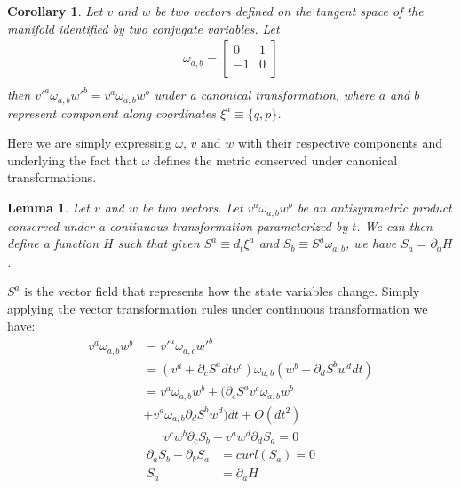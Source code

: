 \documentclass[aps,pra,10pt,twocolumn,floatfix,nofootinbib]{revtex4-1}
\newtheorem{cor}[thm]{Corollary}
\newtheorem{lem}[thm]{Lemma}
\theoremstyle{definition}
\begin{document}
\begin{cor}\label{sdofInvariant}
Let $v$ and $w$ be two vectors defined on the tangent space of the manifold identified by two conjugate variables. Let
\begin{align*}
\omega_{a, b} = \left[
  \begin{array}{cc}
    0 & 1 \\
    -1 & 0 \\
  \end{array}
\right] \\
\end{align*}
then $v'^{a} \omega_{a, b} w'^{b}=v^{a} \omega_{a, b} w^{b}$ under a canonical transformation, where $a$ and $b$ represent component along coordinates $\xi^{a} \equiv \{q,p\}$.
\end{cor}

Here we are simply expressing $\omega$, $v$ and $w$ with their respective components and underlying the fact that $\omega$ defines the metric conserved under canonical transformations.

\begin{lem}\label{genAntisim}
Let $v$ and $w$ be two vectors. Let $v^{a} \omega_{a, b} w^{b}$ be an antisymmetric product conserved under a continuous transformation parameterized by $t$. We can then define a function $H$ such that given $S^{a} \equiv d_{t}\xi^{a}$ and $S_{b} \equiv S^{a} \omega_{a, b}$, we have $S_{a} = \partial_{a}H$.
\end{lem}

$S^{a}$ is the vector field that represents how the state variables change. Simply applying the vector transformation rules under continuous transformation we have:
\begin{align*}
v^{a} \omega_{a, b} w^{b} &= v'^{a} \omega_{a, c} w'^{b}  \\
&= (v^{a} + \partial_{c} S^{a} dt v^{c}) \omega_{a, b} ( w^{b} + \partial_{d} S^{b} w^{d} dt) \\
&= v^{a} \omega_{a, b} w^{b} + (\partial_{c} S^{a} v^{c} \omega_{a, b} w^{b} \\
 &+ v^{a} \omega_{a, b} \partial_{d} S^{b} w^{d}) dt + O(dt^2)
\end{align*}
\begin{align*}
v^{c} w^{b} \partial_{c} S_{b} - v^{a} w^{d} \partial_{d} S_{a} = 0
\end{align*}
\begin{align*}
\partial_{a} S_{b} - \partial_{b} S_{a} &= curl(S_{a}) = 0 \\
S_{a} &= \partial_{a}H
\end{align*}
\end{document}
